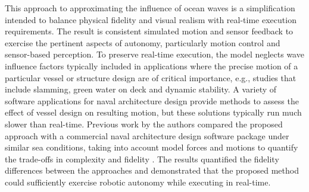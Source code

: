 \documentclass[utf8]{frontiersSCNS} %
\begin{document}
This approach to approximating the influence of ocean waves is a simplification intended to balance physical fidelity and visual realism with real-time execution requirements. The result is consistent simulated motion and sensor feedback to exercise the pertinent aspects of autonomy, particularly motion control and sensor-based perception. To preserve real-time execution, the model neglects wave influence factors typically included in applications where the precise motion of a particular vessel or structure design are of critical importance, e.g., studies that include slamming, green water on deck and dynamic stability. A variety of software applications for naval architecture design provide methods to assess the effect of vessel design on resulting motion, but these solutions typically run much slower than real-time. Previous work by the authors  compared the proposed approach with a commercial naval architecture design software package under similar sea conditions, taking into account model forces and motions to quantify the trade-offs in complexity and fidelity \citep{malia18modeling}. The results quantified the fidelity differences between the approaches and demonstrated that the proposed method could sufficiently exercise robotic autonomy while executing in real-time.\\

\end{document}
